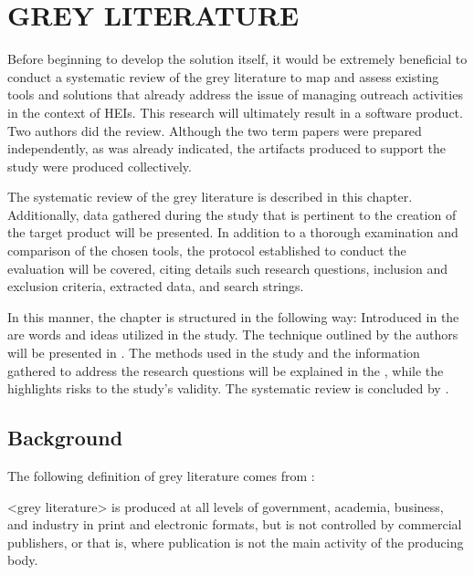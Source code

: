 \chapter{GREY LITERATURE}\label{grey_literature}

Before beginning to develop the solution itself, it would be extremely beneficial to conduct a systematic review of the grey literature to map and assess existing tools and solutions that already address the issue of managing outreach activities in the context of \acp{HEI}. This research will ultimately result in a software product. Two authors did the review. Although the two term papers were prepared independently, as was already indicated, the artifacts produced to support the study were produced collectively.

The systematic review of the grey literature is described in this chapter. Additionally, data gathered during the study that is pertinent to the creation of the target product will be presented. In addition to a thorough examination and comparison of the chosen tools, the protocol established to conduct the evaluation will be covered, citing details such research questions, inclusion and exclusion criteria, extracted data, and search strings.

In this manner, the chapter is structured in the following way: Introduced in the  are words and ideas utilized in the study. The technique outlined by the authors will be presented in . The methods used in the study and the information gathered to address the research questions will be explained in the , while the  highlights risks to the study's validity. The systematic review is concluded by .

\section{Background}\label{sec:gl-background}

The following definition of grey literature comes from \textcite[p.2]{garousi2019guidelines}:
\begin{citacao}
  <grey literature> is produced at all levels of government, academia, business, and industry in print and electronic formats, but is not controlled by commercial publishers, or that is, where publication is not the main activity of the producing body.
\end{citacao}

